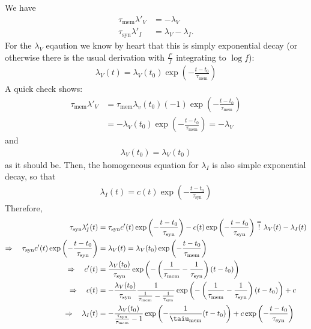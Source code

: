 \documentclass[a4paper]{article}
\begin{document}
We have
\begin{align}
  \tau_{\text{mem}} \lambda'_V &= - \lambda_V \\
  \tau_{\text{syn}} \lambda'_I &= \lambda_V - \lambda_I .
\end{align}
For the $\lambda_V$ eqaution we know by heart that this is simply exponential decay (or otherwise there is the usual derivation with $\frac{f'}{f}$ integrating to $\log f$):
\begin{align}
  \lambda_V(t) = \lambda_V(t_0) \exp\left(-\frac{t-t_0}{\tau_{\text{mem}}}\right)
\end{align}  
A quick check shows:
\begin{align}
  \tau_{\text{mem}} \lambda'_V &= \tau_{\text{mem}} \lambda_v(t_0) (-1) \exp\left(- \frac{t-t_0}{\tau_{\text{mem}}} \right) \\
  &= -\lambda_V(t_0) \exp\left(- \frac{t-t_0}{\tau_{\text{mem}}} \right) = - \lambda_V
\end{align}
and
\begin{align}
  \lambda_V(t_0)= \lambda_V(t_0)
\end{align}
as it should be. Then, the homogeneous equation for $\lambda_I$ is also simple exponential decay, so that
\begin{align}
\lambda_I(t) = c(t) \exp\left(-\frac{t-t_0}{\tau_{\text{syn}}} \right)
\end{align}
Therefore,
\begin{align}
  \tau_{\text{syn}} \lambda'_I (t) &= \tau_{\text{syn}} c'(t) \exp\left(-\frac{t-t_0}{\tau_{\text{syn}}} \right) - c(t) \exp\left(-\frac{t-t_0}{\tau_{\text{syn}}} \right) \stackrel{=}{!} \lambda_V(t) - \lambda_I(t) \\
  \Rightarrow  \quad \tau_{\text{syn}} c'(t) \exp\left(-\frac{t-t_0}{\tau_{\text{syn}}} \right) &= \lambda_V(t) =  \lambda_V(t_0) \exp\left(-\frac{t-t_0}{\tau_{\text{mem}}}\right) \\
  \Rightarrow \quad c'(t) &= \frac{\lambda_V(t_0)}{\tau_{\text{syn}}} \exp \left(-\left(\frac{1}{\tau_{\text{mem}}} - \frac{1}{\tau_{\text{syn}}} \right) (t-t_0)\right) \\
  \Rightarrow \quad c(t) &= - \frac{\lambda_V(t_0)}{\tau_{\text{syn}}} \frac{1}{\frac{1}{\tau_{\text{mem}}} - \frac{1}{\tau_{\text{syn}}}} \exp \left(-\left(\frac{1}{\tau_{\text{mem}}} - \frac{1}{\tau_{\text{syn}}} \right) (t-t_0)\right) +c \\
  \Rightarrow \quad \lambda_I(t) &= -\frac{\lambda_V(t_0)}{\frac{\tau_{\text{syn}}}{\tau_{\text{mem}}} -1} \exp \left( -\frac{1}{\taiu_{\text{mem}}} (t-t_0)\right) + c \exp\left(-\frac{t-t_0}{\tau_{\text{syn}}} \right) 
\end{align}
\end{document}

